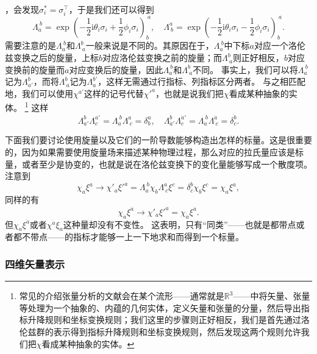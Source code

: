 \documentclass[hyperref, UTF8, a4paper]{ctexart}
\newcommand*{\ii}{\mathrm{i}}
\newcommand*{\reals}{\mathbb{R}}
\begin{document}
，会发现$\sigma_i^* = \sigma_i^\top$，于是我们还可以得到
\begin{equation}
    \Lambda_{\dot{a}}^{\ \dot{b}} = \exp \left( - \frac{1}{2} \ii \theta_i \sigma_i + \frac{1}{2} \phi_i \sigma_i \right)_b^{\ a}, \quad \Lambda^a_{\ b} = \exp \left( - \frac{1}{2} \ii \theta_i \sigma_i - \frac{1}{2} \phi_i \sigma_i \right)_b^{\ a}.
\end{equation}
需要注意的是$\Lambda_a^{\ b}$和$\Lambda^b_{\ a}$一般来说是不同的。其原因在于，$\Lambda_a^{\ b}$中下标$a$对应一个洛伦兹变换之后的旋量，上标$b$对应洛伦兹变换之前的旋量；而$\Lambda_{\ a}^b$则正好相反，$b$对应变换前的旋量而$a$对应变换后的旋量，因此$\Lambda_a^{\ b}$和$\Lambda^b_{\ a}$不同。
事实上，我们可以将$\Lambda_a^{\ b}$记为$\Lambda_{a'}^b$，而将$\Lambda^b_{\ a}$记为$\Lambda_a^{b'}$，这样无需通过行指标、列指标区分两者。
与之相匹配地，我们可以使用$\chi^{a'}$这样的记号代替${\chi'}^{a}$，也就是说我们把$\chi$看成某种抽象的实体。%
\footnote{常见的介绍张量分析的文献会在某个流形——通常就是$\reals^3$——中将矢量、张量等处理为一个抽象的、内蕴的几何实体，定义矢量和张量的分量，然后导出指标升降规则和坐标变换规则；我们这里的步骤则正好相反，我们是首先通过洛伦兹群的表示得到指标升降规则和坐标变换规则，然后发现这两个规则允许我们把$\chi$看成某种抽象的实体。}
这样
\begin{equation}
    \Lambda_{a'}^b \Lambda^{a'}_c = \Lambda_a^{\ b} \Lambda^a_{\ c} = \delta_b^a, \quad \Lambda_{\dot{a}'}^{\dot{b}} \Lambda^{\dot{a}'}_{\dot{c}} = \Lambda_{\dot{a}}^{\ \dot{b}} \Lambda^{\dot{a}}_{\ \dot{c}} = \delta_{\dot{c}}^{\dot{b}}.
\end{equation}

下面我们要讨论使用旋量以及它们的一阶导数能够构造出怎样的标量。这是很重要的，因为如果需要使用旋量场来描述某种物理过程，那么对应的拉氏量应该是标量，或者至少是协变的，也就是说在洛伦兹变换下的变化量能够写成一个散度项。
注意到
\[
    \chi_a \xi^a \longrightarrow \chi'_a {\xi'}^a = \Lambda_a^{\ b} \chi_b \Lambda^a_{\ c} \xi^c = \delta_c^b \chi_b \xi^c = \chi_a \xi^a,
\]
同样的有
\[
    \chi_{\dot{a}} \xi^{\dot{a}} \longrightarrow \chi'_{\dot{a}} {\xi'}^{\dot{a}} = \chi_{\dot{a}} \xi^{\dot{a}}.
\]
但$\chi_a \xi^{\dot{a}}$或者$\chi^{\dot{a}} \xi_a$这种量却没有不变性。
这表明，只有“同类”——也就是都带点或者都不带点——的指标才能够一上一下地求和而得到一个标量。

\subsubsection{四维矢量表示}\label{sec:4-vector-representation}
\end{document}
